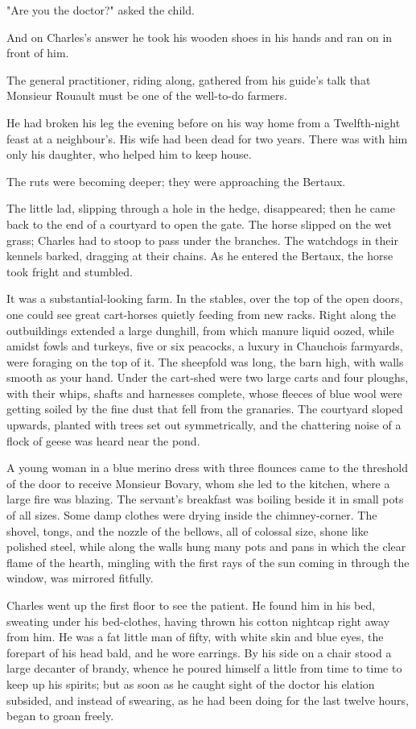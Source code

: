 \documentclass[11pt,twocolumn]{ltugboat}
\begin{document}
"Are you the doctor?" asked the child.

And on Charles's answer he took his wooden shoes in his hands and ran on
in front of him.

The general practitioner, riding along, gathered from his guide's talk
that Monsieur Rouault must be one of the well-to-do farmers.

He had broken his leg the evening before on his way home from a
Twelfth-night feast at a neighbour's. His wife had been dead for two
years. There was with him only his daughter, who helped him to keep
house.

The ruts were becoming deeper; they were approaching the Bertaux.

The little lad, slipping through a hole in the hedge, disappeared;
then he came back to the end of a courtyard to open the gate. The
horse slipped on the wet grass; Charles had to stoop to pass under
the branches. The watchdogs in their kennels barked, dragging at their
chains. As he entered the Bertaux, the horse took fright and stumbled.

It was a substantial-looking farm. In the stables, over the top of the
open doors, one could see great cart-horses quietly feeding from new
racks. Right along the outbuildings extended a large dunghill, from
which manure liquid oozed, while amidst fowls and turkeys, five or six
peacocks, a luxury in Chauchois farmyards, were foraging on the top of
it. The sheepfold was long, the barn high, with walls smooth as your
hand. Under the cart-shed were two large carts and four ploughs, with
their whips, shafts and harnesses complete, whose fleeces of blue wool
were getting soiled by the fine dust that fell from the granaries. The
courtyard sloped upwards, planted with trees set out symmetrically, and
the chattering noise of a flock of geese was heard near the pond.

A young woman in a blue merino dress with three flounces came to the
threshold of the door to receive Monsieur Bovary, whom she led to the
kitchen, where a large fire was blazing. The servant's breakfast was
boiling beside it in small pots of all sizes. Some damp clothes were
drying inside the chimney-corner. The shovel, tongs, and the nozzle
of the bellows, all of colossal size, shone like polished steel, while
along the walls hung many pots and pans in which the clear flame of the
hearth, mingling with the first rays of the sun coming in through the
window, was mirrored fitfully.

Charles went up the first floor to see the patient. He found him in his
bed, sweating under his bed-clothes, having thrown his cotton nightcap
right away from him. He was a fat little man of fifty, with white skin
and blue eyes, the forepart of his head bald, and he wore earrings. By
his side on a chair stood a large decanter of brandy, whence he poured
himself a little from time to time to keep up his spirits; but as soon
as he caught sight of the doctor his elation subsided, and instead of
swearing, as he had been doing for the last twelve hours, began to groan
freely.
\end{document}
